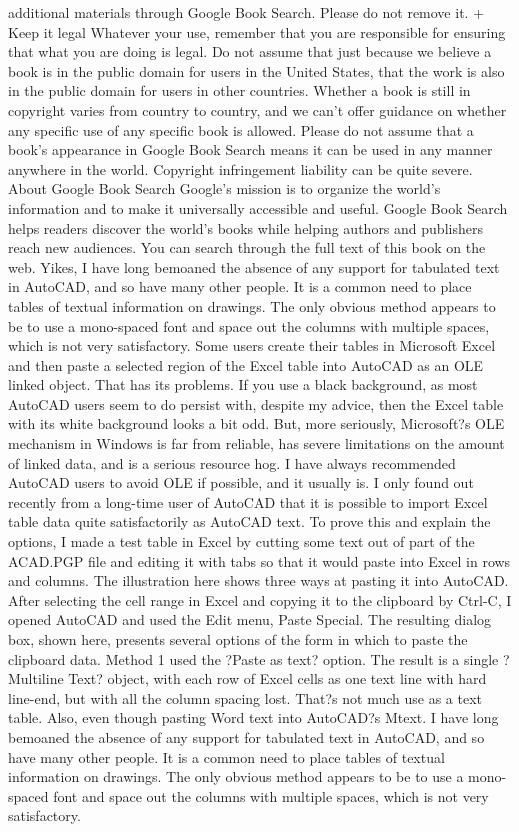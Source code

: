 \documentclass[a4paper]{article}
\begin{document}
additional materials through Google Book Search. Please do not remove it. 
+ Keep it legal Whatever your use, remember that you are responsible for ensuring that what you are doing is legal. Do not assume that just 
because we believe a book is in the public domain for users in the United States, that the work is also in the public domain for users in other 
countries. Whether a book is still in copyright varies from country to country, and we can't offer guidance on whether any specific use of 
any specific book is allowed. Please do not assume that a book's appearance in Google Book Search means it can be used in any manner 
anywhere in the world. Copyright infringement liability can be quite severe. 
About Google Book Search 
Google's mission is to organize the world's information and to make it universally accessible and useful. Google Book Search helps readers 
discover the world's books while helping authors and publishers reach new audiences. You can search through the full text of this book on the web. Yikes, I have long bemoaned the absence of any support for tabulated text in AutoCAD, and so have many other people. It is a common need to place tables of textual information on drawings. The only obvious method appears to be to use a mono-spaced font and space out the columns with multiple spaces, which is not very satisfactory.
Some users create their tables in Microsoft Excel and then paste a selected region of the Excel table into AutoCAD as an OLE linked object. That has its problems. If you use a black background, as most AutoCAD users seem to do persist with, despite my advice, then the Excel table with its white background looks a bit odd. But, more seriously, Microsoft?s OLE mechanism in Windows is far from reliable, has severe limitations on the amount of linked data, and is a serious resource hog. I have always recommended AutoCAD users to avoid OLE if possible, and it usually is.
I only found out recently from a long-time user of AutoCAD that it is possible to import Excel table data quite satisfactorily as AutoCAD text. To prove this and explain the options, I made a test table in Excel by cutting some text out of part of the ACAD.PGP file and editing it with tabs so that it would paste into Excel in rows and columns. The illustration here shows three ways at pasting it into AutoCAD. After selecting the cell range in Excel and copying it to the clipboard by Ctrl-C, I opened AutoCAD and used the Edit menu, Paste Special. The resulting dialog box, shown here, presents several options of the form in which to paste the clipboard data.
Method 1 used the ?Paste as text? option. The result is a single ?Multiline Text? object, with each row of Excel cells as one text line with hard line-end, but with all the column spacing lost. That?s not much use as a text table. Also, even though pasting Word text into AutoCAD?s Mtext. I have long bemoaned the absence of any support for tabulated text in AutoCAD, and so have many other people. It is a common need to place tables of textual information on drawings. The only obvious method appears to be to use a mono-spaced font and space out the columns with multiple spaces, which is not very satisfactory.
\end{document}
